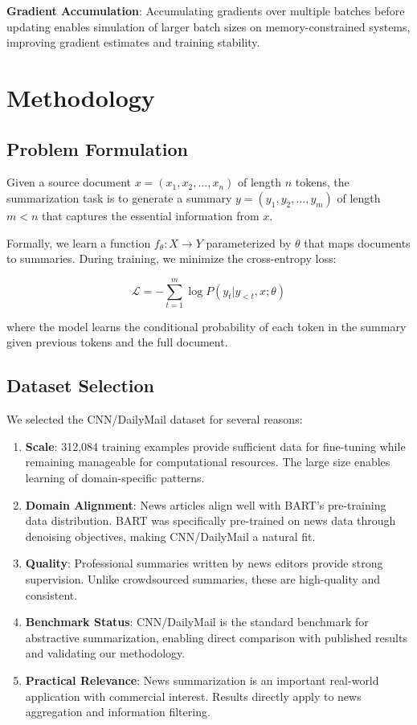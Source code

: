 \documentclass[12pt,a4paper,oneside]{report}
\begin{document}
\textbf{Gradient Accumulation}: Accumulating gradients over multiple batches before updating enables simulation of larger batch sizes on memory-constrained systems, improving gradient estimates and training stability.

\chapter{Methodology}
\label{ch:methodology}

\section{Problem Formulation}
Given a source document $x = (x_1, x_2, \ldots, x_n)$ of length $n$ tokens, the summarization task is to generate a summary $y = (y_1, y_2, \ldots, y_m)$ of length $m < n$ that captures the essential information from $x$.

Formally, we learn a function $f_\theta: X \rightarrow Y$ parameterized by $\theta$ that maps documents to summaries. During training, we minimize the cross-entropy loss:

\begin{equation}
\mathcal{L} = -\sum_{t=1}^{m} \log P(y_t | y_{<t}, x; \theta)
\end{equation}

where the model learns the conditional probability of each token in the summary given previous tokens and the full document.

\section{Dataset Selection}
We selected the CNN/DailyMail dataset for several reasons:
\begin{enumerate}
    \item \textbf{Scale}: 312,084 training examples provide sufficient data for fine-tuning while remaining manageable for computational resources. The large size enables learning of domain-specific patterns.
    \item \textbf{Domain Alignment}: News articles align well with BART's pre-training data distribution. BART was specifically pre-trained on news data through denoising objectives, making CNN/DailyMail a natural fit.
    \item \textbf{Quality}: Professional summaries written by news editors provide strong supervision. Unlike crowdsourced summaries, these are high-quality and consistent.
    \item \textbf{Benchmark Status}: CNN/DailyMail is the standard benchmark for abstractive summarization, enabling direct comparison with published results and validating our methodology.
    \item \textbf{Practical Relevance}: News summarization is an important real-world application with commercial interest. Results directly apply to news aggregation and information filtering.
\end{enumerate}
\end{document}
